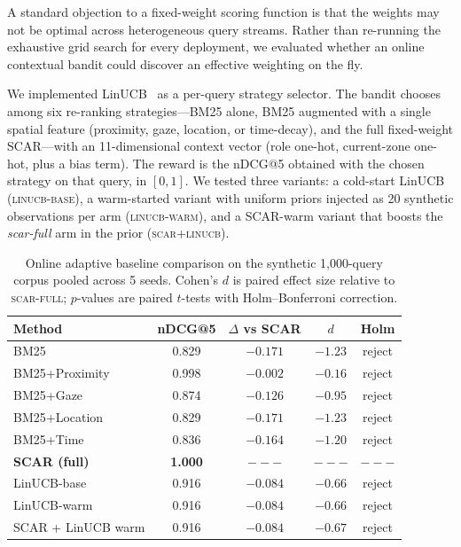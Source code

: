 \documentclass[journal]{IEEEtran}
\begin{document}
A standard objection to a fixed-weight scoring function is that the weights may
not be optimal across heterogeneous query streams. Rather than re-running the
exhaustive grid search for every deployment, we evaluated whether an online
contextual bandit could discover an effective weighting on the fly.

We implemented LinUCB~\cite{li2010contextual} as a per-query strategy selector.
The bandit chooses among six re-ranking strategies---BM25 alone, BM25 augmented
with a single spatial feature (proximity, gaze, location, or time-decay), and
the full fixed-weight SCAR---with an 11-dimensional context vector
(role one-hot, current-zone one-hot, plus a bias term). The reward is the
nDCG@5 obtained with the chosen strategy on that query, in $[0, 1]$. We tested
three variants: a cold-start LinUCB (\textsc{linucb-base}), a warm-started
variant with uniform priors injected as 20 synthetic observations per arm
(\textsc{linucb-warm}), and a SCAR-warm variant that boosts the
\textit{scar-full} arm in the prior (\textsc{scar+linucb}).

\begin{table}[htbp]
\centering
\caption{Online adaptive baseline comparison on the synthetic 1{,}000-query corpus pooled across 5 seeds. Cohen's $d$ is paired effect size relative to \textsc{scar-full}; $p$-values are paired $t$-tests with Holm--Bonferroni correction.}
\label{tab:linucb_synth}
\begin{tabular}{lcccc}
\hline
\textbf{Method} & \textbf{nDCG@5} & \textbf{$\Delta$ vs SCAR} & \textbf{$d$} & \textbf{Holm} \\
\hline
BM25                & 0.829 & $-0.171$ & $-1.23$ & reject \\
BM25+Proximity      & 0.998 & $-0.002$ & $-0.16$ & reject \\
BM25+Gaze           & 0.874 & $-0.126$ & $-0.95$ & reject \\
BM25+Location       & 0.829 & $-0.171$ & $-1.23$ & reject \\
BM25+Time           & 0.836 & $-0.164$ & $-1.20$ & reject \\
\textbf{SCAR (full)} & \textbf{1.000} & $---$ & $---$ & $---$ \\
LinUCB-base         & 0.916 & $-0.084$ & $-0.66$ & reject \\
LinUCB-warm         & 0.916 & $-0.084$ & $-0.66$ & reject \\
SCAR + LinUCB warm  & 0.916 & $-0.084$ & $-0.67$ & reject \\
\hline
\end{tabular}
\end{table}
\end{document}
